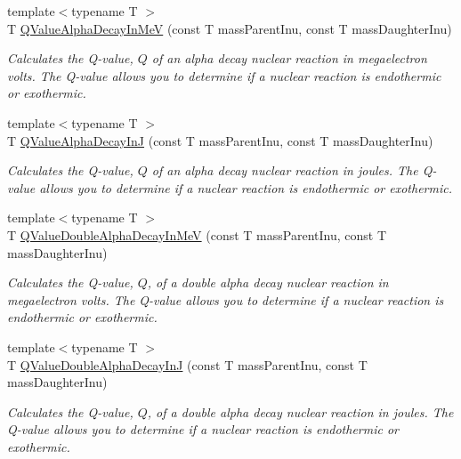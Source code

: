 \begin{DoxyCompactItemize}
{\footnotesize template$<$typename T $>$ }\\T \mbox{\hyperlink{group___e_g_x_phys-_q_value-_alpha_ga4f9a38d3ad4bf93471a0affb493b6e72}{Q\+Value\+Alpha\+Decay\+In\+MeV}} (const T mass\+Parent\+Inu, const T mass\+Daughter\+Inu)
\begin{DoxyCompactList}\small\item\em Calculates the Q-\/value, $Q$ of an alpha decay nuclear reaction in megaelectron volts. The Q-\/value allows you to determine if a nuclear reaction is endothermic or exothermic. \end{DoxyCompactList}\item 
{\footnotesize template$<$typename T $>$ }\\T \mbox{\hyperlink{group___e_g_x_phys-_q_value-_alpha_gab8a50c18f6de3c1b6ed280c26c3ff3a5}{Q\+Value\+Alpha\+Decay\+InJ}} (const T mass\+Parent\+Inu, const T mass\+Daughter\+Inu)
\begin{DoxyCompactList}\small\item\em Calculates the Q-\/value, $Q$ of an alpha decay nuclear reaction in joules. The Q-\/value allows you to determine if a nuclear reaction is endothermic or exothermic. \end{DoxyCompactList}\item 
{\footnotesize template$<$typename T $>$ }\\T \mbox{\hyperlink{group___e_g_x_phys-_q_value-_alpha_ga85230c793adc7fc78fef760874f75ad9}{Q\+Value\+Double\+Alpha\+Decay\+In\+MeV}} (const T mass\+Parent\+Inu, const T mass\+Daughter\+Inu)
\begin{DoxyCompactList}\small\item\em Calculates the Q-\/value, $Q$, of a double alpha decay nuclear reaction in megaelectron volts. The Q-\/value allows you to determine if a nuclear reaction is endothermic or exothermic. \end{DoxyCompactList}\item 
{\footnotesize template$<$typename T $>$ }\\T \mbox{\hyperlink{group___e_g_x_phys-_q_value-_alpha_ga015ade04346d0c6dae4dda8e3aab8cbd}{Q\+Value\+Double\+Alpha\+Decay\+InJ}} (const T mass\+Parent\+Inu, const T mass\+Daughter\+Inu)
\begin{DoxyCompactList}\small\item\em Calculates the Q-\/value, $Q$, of a double alpha decay nuclear reaction in joules. The Q-\/value allows you to determine if a nuclear reaction is endothermic or exothermic. \end{DoxyCompactList}\item 

\end{DoxyCompactItemize}
